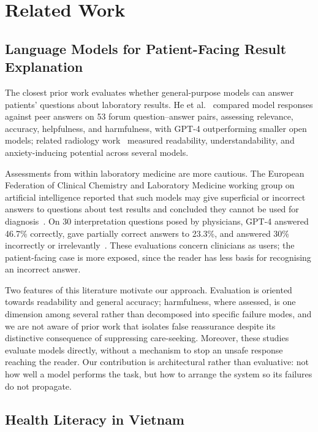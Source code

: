 \documentclass{svproc}
\begin{document}
\section{Related Work}

\subsection{Language Models for Patient-Facing Result Explanation}

The closest prior work evaluates whether general-purpose models can answer
patients' questions about laboratory results. He et al.~\cite{he2024quality}
compared model responses against peer answers on 53 forum question--answer
pairs, assessing relevance, accuracy, helpfulness, and harmfulness, with
GPT-4 outperforming smaller open models; related radiology
work~\cite{llm_radiology_explain} measured readability, understandability,
and anxiety-inducing potential across several models.

Assessments from within laboratory medicine are more cautious. The
European Federation of Clinical Chemistry and Laboratory Medicine working
group on artificial intelligence reported that such models may give
superficial or incorrect answers to questions about test results and
concluded they cannot be used for diagnosis~\cite{cadamuro2023eflm}. On 30
interpretation questions posed by physicians, GPT-4 answered 46.7\%
correctly, gave partially correct answers to 23.3\%, and answered 30\%
incorrectly or irrelevantly~\cite{munoz2023accuracy}. These evaluations
concern clinicians as users; the patient-facing case is more exposed,
since the reader has less basis for recognising an incorrect answer.

Two features of this literature motivate our approach. Evaluation is
oriented towards readability and general accuracy; harmfulness, where
assessed, is one dimension among several rather than decomposed into
specific failure modes, and we are not aware of prior work that isolates
false reassurance despite its distinctive consequence of suppressing
care-seeking. Moreover, these studies evaluate models directly, without a
mechanism to stop an unsafe response reaching the reader. Our contribution
is architectural rather than evaluative: not how well a model performs the
task, but how to arrange the system so its failures do not propagate.

\subsection{Health Literacy in Vietnam}
\end{document}
